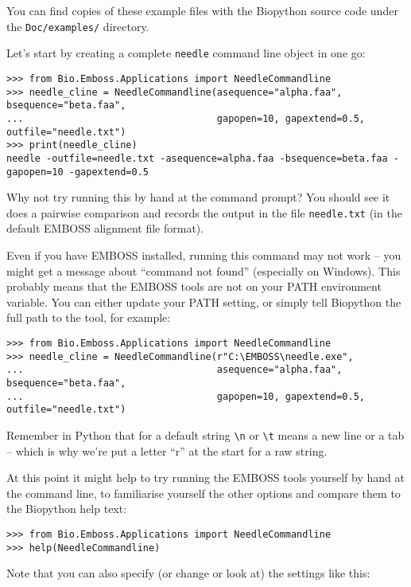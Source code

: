 You can find copies of these example files with the Biopython source code
under the \verb|Doc/examples/| directory.

Let's start by creating a complete \texttt{needle} command line object in one go:

\begin{verbatim}
>>> from Bio.Emboss.Applications import NeedleCommandline
>>> needle_cline = NeedleCommandline(asequence="alpha.faa", bsequence="beta.faa",
...                                  gapopen=10, gapextend=0.5, outfile="needle.txt")
>>> print(needle_cline)
needle -outfile=needle.txt -asequence=alpha.faa -bsequence=beta.faa -gapopen=10 -gapextend=0.5
\end{verbatim}

Why not try running this by hand at the command prompt? You should see it does a
pairwise comparison and records the output in the file \texttt{needle.txt} (in the
default EMBOSS alignment file format).

Even if you have EMBOSS installed, running this command may not work -- you
might get a message about ``command not found'' (especially on Windows). This
probably means that the EMBOSS tools are not on your PATH environment
variable. You can either update your PATH setting, or simply tell Biopython
the full path to the tool, for example:

\begin{verbatim}
>>> from Bio.Emboss.Applications import NeedleCommandline
>>> needle_cline = NeedleCommandline(r"C:\EMBOSS\needle.exe",
...                                  asequence="alpha.faa", bsequence="beta.faa",
...                                  gapopen=10, gapextend=0.5, outfile="needle.txt")
\end{verbatim}

\noindent Remember in Python that for a default string \verb|\n| or \verb|\t| means a
new line or a tab -- which is why we're put a letter ``r'' at the start for a raw string.

At this point it might help to try running the EMBOSS tools yourself by hand at the
command line, to familiarise yourself the other options and compare them to the
Biopython help text:

\begin{verbatim}
>>> from Bio.Emboss.Applications import NeedleCommandline
>>> help(NeedleCommandline)
\end{verbatim}

Note that you can also specify (or change or look at) the settings like this:


